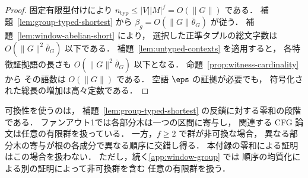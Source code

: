 \begin{proof}
固定有限型付けにより
$n_{\mathrm{typ}}\le|V||M|^f=O(\|G\|)$ である．
補題~\ref{lem:group-typed-shortest} から
$\beta_g=O(\|G\|\bar\theta_G)$ が従う．
補題~\ref{lem:window-abelian-short} により，
選択した正準タプルの総文字数は
$O(\|G\|^2\bar\theta_G)$ 以下である．
補題~\ref{lem:untyped-contexts} を適用すると，
各特徴証拠語の長さも
$O(\|G\|^2\bar\theta_G)$ 以下となる．
命題~\ref{prop:witness-cardinality} から
その語数は $O(\|G\|)$ である．
空語 $\eps$ の証拠が必要でも，
符号化された総長の増加は高々定数である．
\end{proof}

\begin{remark}
可換性を使うのは，
補題~\ref{lem:group-typed-shortest} の反鎖に対する零和の段階である．
ファンアウト1では各部分木は一つの区間に寄与し，
関連する CFG 論文は任意の有限群を扱っている．
一方，$f\ge2$ で群が非可換な場合，
異なる部分木の寄与が根の各成分で異なる順序に交錯し得る．
本付録の零和による証明はこの場合を扱わない．
ただし，続く\ref{app:window-group} では
順序の均質化による別の証明によって非可換群を含む
任意の有限群を扱う．
\end{remark}
